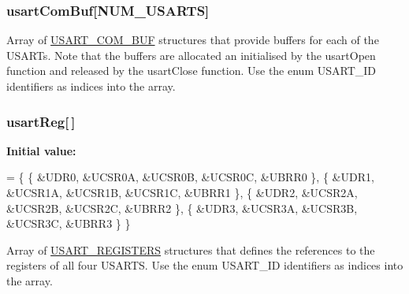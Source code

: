 \subsubsection[{\texorpdfstring{usart\+Com\+Buf}{usartComBuf}}]{ usart\+Com\+Buf\mbox{[}{\bf N\+U\+M\+\_\+\+U\+S\+A\+R\+TS}\mbox{]}}\hypertarget{group__usart_async_module_ga01280f1bdc978bbad7a0ae0fca24f0f4}{}\label{group__usart_async_module_ga01280f1bdc978bbad7a0ae0fca24f0f4}
Array of \hyperlink{group__usart_async_module_struct_u_s_a_r_t___c_o_m___b_u_f}{U\+S\+A\+R\+T\+\_\+\+C\+O\+M\+\_\+\+B\+UF} structures that provide buffers for each of the U\+S\+A\+RT\textquotesingle{}s. Note that the buffers are allocated an initialised by the usart\+Open function and released by the usart\+Close function. Use the enum U\+S\+A\+R\+T\+\_\+\+ID identifiers as indices into the array. 
\subsubsection[{\texorpdfstring{usart\+Reg}{usartReg}}]{ usart\+Reg\mbox{[}$\,$\mbox{]}}\hypertarget{group__usart_async_module_gaf964270351d58d348a34bfec204765cb}{}\label{group__usart_async_module_gaf964270351d58d348a34bfec204765cb}
{\bfseries Initial value\+:}
\begin{DoxyCode}
=
\{
        \{ &UDR0, &UCSR0A, &UCSR0B, &UCSR0C, &UBRR0  \},
        \{ &UDR1, &UCSR1A, &UCSR1B, &UCSR1C, &UBRR1  \},
        \{ &UDR2, &UCSR2A, &UCSR2B, &UCSR2C, &UBRR2  \},
        \{ &UDR3, &UCSR3A, &UCSR3B, &UCSR3C, &UBRR3  \}
\}
\end{DoxyCode}
Array of \hyperlink{group__usart_async_module_struct_u_s_a_r_t___r_e_g_i_s_t_e_r_s}{U\+S\+A\+R\+T\+\_\+\+R\+E\+G\+I\+S\+T\+E\+RS} structures that defines the references to the registers of all four U\+S\+A\+R\+TS. Use the enum U\+S\+A\+R\+T\+\_\+\+ID identifiers as indices into the array. 
